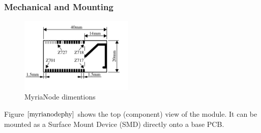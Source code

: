 \documentclass[a4paper,10pt]{report}
\begin{document}
\subsubsection{Mechanical and Mounting}
\begin{figure}
  \begin{center}
    \includegraphics[width=0.48\textwidth]{myrianodephy}
  \end{center}
  \caption{MyriaNode dimentions}
  \label{myrianodephy}
\end{figure}
Figure $\ref{myrianodephy}$ shows the top (component) view of the module. It can be mounted as a Surface Mount Device (SMD) directly onto a base PCB. %
\end{document}
